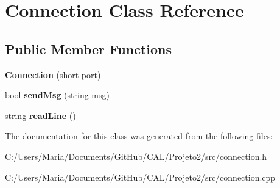 \hypertarget{class_connection}{}\section{Connection Class Reference}
\label{class_connection}
\subsection*{Public Member Functions}
\begin{DoxyCompactItemize}
\item 
\hypertarget{class_connection_a8089476d48ba545f44e691cd4bd0278d}{}\label{class_connection_a8089476d48ba545f44e691cd4bd0278d} 
{\bfseries Connection} (short port)
\item 
\hypertarget{class_connection_a4b9f6db1fb42fc9857f829fa0bc52e6e}{}\label{class_connection_a4b9f6db1fb42fc9857f829fa0bc52e6e} 
bool {\bfseries send\+Msg} (string msg)
\item 
\hypertarget{class_connection_a1df16b436751b686d96c24ca0c498659}{}\label{class_connection_a1df16b436751b686d96c24ca0c498659} 
string {\bfseries read\+Line} ()
\end{DoxyCompactItemize}


The documentation for this class was generated from the following files\+:\begin{DoxyCompactItemize}
\item 
C\+:/\+Users/\+Maria/\+Documents/\+Git\+Hub/\+C\+A\+L/\+Projeto2/src/connection.\+h\item 
C\+:/\+Users/\+Maria/\+Documents/\+Git\+Hub/\+C\+A\+L/\+Projeto2/src/connection.\+cpp\end{DoxyCompactItemize}
